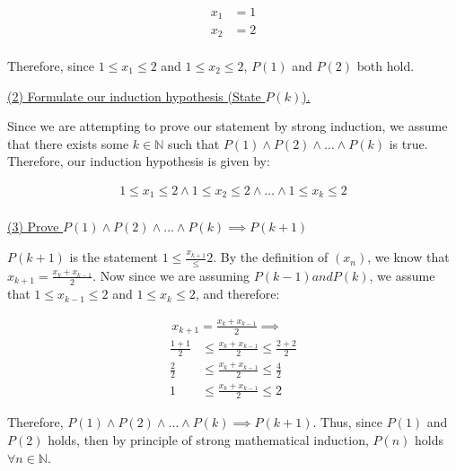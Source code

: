 \documentclass{article}
\begin{document}
\begin{align*}
	x_1 &= 1 \\
	x_2 &= 2 \\
\end{align*}

Therefore, since $1 \le x_1 \le 2$ and $1 \le x_2 \le 2$, $P(1)$ and $P(2)$ both hold.

\begin{center}
	\large{\underline{(2) Formulate our induction hypothesis (State $P(k)$).}}
\end{center}

\vspace{.3cm}

Since we are attempting to prove our statement by strong induction, we assume that there exists some $k \in \mathbb{N}$ such that $P(1) \wedge P(2) \wedge \ldots \wedge P(k)$ is true. Therefore, our induction hypothesis is given by:

\begin{align*}
	1 \le x_1 \le 2 \wedge 1 \le x_2 \le 2 \wedge \ldots \wedge 1 \le x_k \le 2 \\
\end{align*}

\begin{center}
	\large{\underline{(3) Prove $P(1) \wedge P(2) \wedge \ldots \wedge P(k) \implies P(k + 1)$}} \\
\end{center}

\vspace{.3cm}

$P(k + 1)$ is the statement $1 \le \frac{x_{k + 1}} \le 2$. By the definition of $(x_n)$, we know that $x_{k + 1} = \frac{x_k + x_{k - 1}}{2}$. Now since we are assuming $P(k - 1) and P(k)$, we assume that $1 \le x_{k - 1} \le 2$ and $1 \le x_k \le 2$, and therefore:

\begin{align*}
	x_{k + 1} = \frac{x_{k} + x_{k - 1}}{2} \implies \quad
\end{align*}
\vspace{-.7cm}
\begin{align*}
	\frac{1 + 1}{2} &\le \frac{x_k + x_{k - 1}}{2} \le \frac{2 + 2}{2} \\
	\frac{2}{2} &\le \frac{x_k + x_{k - 1}}{2} \le \frac{4}{2} \\
	1 &\le \frac{x_k + x_{k - 1}}{2} \le 2
\end{align*}

Therefore, $P(1) \wedge P(2) \wedge \ldots \wedge P(k) \implies P(k + 1)$. Thus, since $P(1)$ and $P(2)$ holds, then by principle of strong mathematical induction, $P(n)$ holds $\forall n \in \mathbb{N}$.
\end{document}

